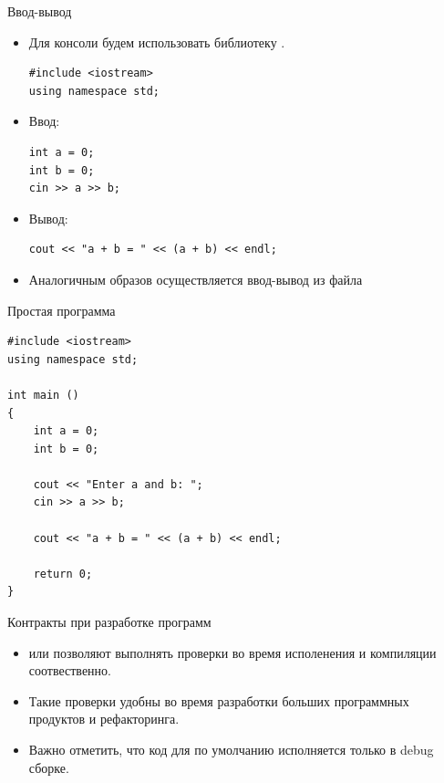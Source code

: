 \documentclass[aspectration=1610,t]{beamer}
\begin{document}
\begin{frame}[fragile]{Ввод-вывод}
    \begin{itemize}    
        \item Для консоли будем использовать библиотеку .
        \begin{lstlisting}
#include <iostream>
using namespace std;
            \end{lstlisting}
        \item Ввод:
            \begin{lstlisting}
int a = 0;
int b = 0;
cin >> a >> b;
            \end{lstlisting}
        \item Вывод:
            \begin{lstlisting}
cout << "a + b = " << (a + b) << endl;
            \end{lstlisting}
        \item Аналогичным образов осуществляется ввод-вывод из файла 
    \end{itemize}
\end{frame}

\begin{frame}[fragile]{Простая программа}
    \begin{lstlisting}
#include <iostream>
using namespace std;

int main () 
{
    int a = 0;
    int b = 0;

    cout << "Enter a and b: ";
    cin >> a >> b;

    cout << "a + b = " << (a + b) << endl;

    return 0;
}
    \end{lstlisting}
\end{frame}

\begin{frame}[fragile]{Контракты при разработке программ}
    \begin{itemize}
        \item {} или  
            позволяют выполнять проверки во время исполенения и компиляции соотвественно.
        \item Такие проверки удобны во время разработки больших программных продуктов и рефакторинга.
        \item Важно отметить, что код для  
            по умолчанию исполняется только в debug сборке.
    \end{itemize}
\end{frame}
\end{document}

